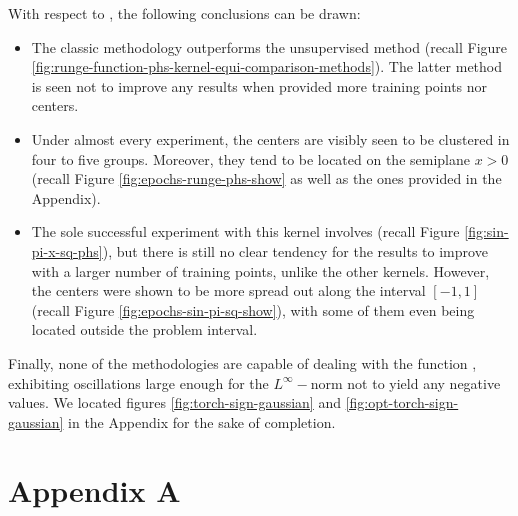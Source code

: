 \documentclass[12pt]{report} %
\newcommand{\tmverbatim}[1]{\text{{\ttfamily{#1}}}}
\begin{document}
With respect to \tmverbatim{phs\_kernel}, the following conclusions can be
drawn:
\begin{itemize}
  \item The classic methodology outperforms the unsupervised method (recall
  Figure \ref{fig:runge-function-phs-kernel-equi-comparison-methods}). The
  latter method is seen not to improve any results when provided more training
  points nor centers.
  
  \item Under almost every experiment, the centers are visibly seen to be
  clustered in four to five groups. Moreover, they tend to be located on the
  semiplane $x > 0$ (recall Figure \ref{fig:epochs-runge-phs-show} as well as
  the ones provided in the Appendix).
  
  \item The sole successful experiment with this kernel involves
  \tmverbatim{sin\_pi\_x\_sq} (recall Figure \ref{fig:sin-pi-x-sq-phs}), but
  there is still no clear tendency for the results to improve with a larger
  number of training points, unlike the other kernels. However, the centers
  were shown to be more spread out along the interval $[- 1, 1]$ (recall
  Figure \ref{fig:epochs-sin-pi-sq-show}), with some of them even being
  located outside the problem interval.
\end{itemize}
Finally, none of the methodologies are capable of dealing with the function
\tmverbatim{torch\_sign}, exhibiting oscillations large enough for the
$L^{\infty} -$norm not to yield any negative values. We located figures
\ref{fig:torch-sign-gaussian} and \ref{fig:opt-torch-sign-gaussian} in the
Appendix for the sake of completion.





\clearpage


\printbibliography




\chapter*{Appendix A}\label{appendix-1d}
\end{document}
